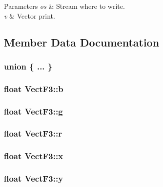 \begin{DoxyParams}{Parameters}
{\em os} & Stream where to write. \\
\hline
{\em v} & Vector print. \\
\hline
\end{DoxyParams}


\subsection{Member Data Documentation}
\hypertarget{classVectF3_adeb5b5512ad9e2cab8c48eeaefa2d078}{\subsubsection[{"@1}]{\setlength{\rightskip}{0pt plus 5cm}union \{ ... \} }}\label{classVectF3_adeb5b5512ad9e2cab8c48eeaefa2d078}
\hypertarget{classVectF3_af17b78fdbc8a19c46a31144b41ff70d6}{
\subsubsection[{b}]{\setlength{\rightskip}{0pt plus 5cm}float Vect\-F3\-::b}}\label{classVectF3_af17b78fdbc8a19c46a31144b41ff70d6}
\hypertarget{classVectF3_af80eb198426897da1d9f8b3b13429c8b}{
\subsubsection[{g}]{\setlength{\rightskip}{0pt plus 5cm}float Vect\-F3\-::g}}\label{classVectF3_af80eb198426897da1d9f8b3b13429c8b}
\hypertarget{classVectF3_ad6da306c6b16f3a84d2b96cb4824cdba}{
\subsubsection[{r}]{\setlength{\rightskip}{0pt plus 5cm}float Vect\-F3\-::r}}\label{classVectF3_ad6da306c6b16f3a84d2b96cb4824cdba}
\hypertarget{classVectF3_a1ec0a761f0461ca38f1ca57cf095f6fa}{
\subsubsection[{x}]{\setlength{\rightskip}{0pt plus 5cm}float Vect\-F3\-::x}}\label{classVectF3_a1ec0a761f0461ca38f1ca57cf095f6fa}
\hypertarget{classVectF3_a8331d1adee2ca04fdcd3f5fa4e133896}{
\subsubsection[{y}]{\setlength{\rightskip}{0pt plus 5cm}float Vect\-F3\-::y}}\label{classVectF3_a8331d1adee2ca04fdcd3f5fa4e133896}
